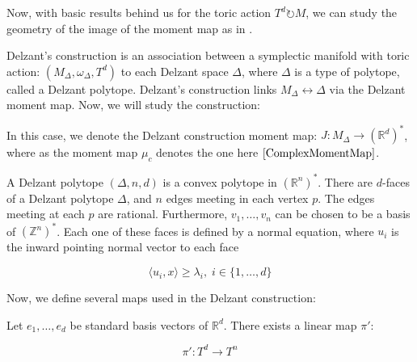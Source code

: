 \begin{remark}
Now, with basic results behind us for the toric action $T^{d} \circlearrowright M$, we can study the geometry of the image of the moment map as in \textcite{Delzant1988}. 
\end{remark}

Delzant's construction is an association between a symplectic manifold with toric action: $(M_{\Delta}, \omega_{\Delta}, T^{d})$ to each Delzant space $\Delta$, where $\Delta$ is a type of polytope, called a Delzant polytope. Delzant's construction links $M_{\Delta} \leftrightarrow \Delta$ via the Delzant moment map. Now, we will study the construction:

\begin{remark}
In this case, we denote the Delzant construction moment map: $J: M_{\Delta} \to (\mathbb{R}^{d})^{*}$, where as the moment map $\mu_{c}$ denotes the one here $\ref{ComplexMomentMap}$.
\end{remark}

\begin{defn}
A Delzant polytope $(\Delta, n, d)$ is a convex polytope in $(\mathbb{R}^{n})^{*}$. There are $d$-faces of a Delzant polytope $\Delta$, and $n$ edges meeting in each vertex $p$. The edges meeting at each $p$ are rational. Furthermore, $v_{1}, \dots, v_{n}$ can be chosen to be a basis of $(\mathbb{Z}^{n})^{*}$. Each one of these faces is defined by a normal equation, where $u_{i}$ is the inward pointing normal vector to each face \textcite{Delzant1988}

\begin{equation}
\langle u_{i}, x \rangle \geq \lambda_{i}, \; i \in \{1, \dots, d \}
\end{equation}
\end{defn}

\noindent Now, we define several maps used in the Delzant construction:

\begin{lemma}
Let $e_{1}, \dots, e_{d}$ be standard basis vectors of $\mathbb{R}^{d}$. There exists a linear map $\pi'$: 

$$\pi': T^{d} \to T^{n}$$
\end{lemma}

